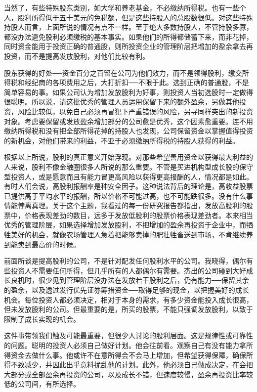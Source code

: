 \documentclass[UTF8,a4paper,zihao=-4,fontset = windows]{ctexart} %
\begin{document}
当然了，有些特殊股东类别，如大学和养老基金，不必缴纳所得税。也有一些个人，股利所得低于五十美元的免税额，但是这些持股人的总股数很低。对这些特殊持股人而言，上面所说的情况有点不一样。至于绝大多数持股人，不管持股多寡，都没办法避免股利必须缴税的基本事实。如果他们的所得都储蓄下来，而非花掉，同时资金能用于投资正确的普通股，则所投资企业的管理阶层把增加的盈余拿去再投资，而不是提高发放股利，对他们比较有利。

股东获得的好处──资金百分之百留在公司为他们效力，而不是领得股利，缴交所得税和经纪商的各项费用之后，大打折扣──不限于此。选到正确的普通股，不是简单容易的事。如果公司认为增加发放股利为好事，则投资人当初选股时一定做得很聪明。所以说，请这批优秀的管理人员运用保留下来的额外盈余，另做其他投资，风险比较低，以免自己必须再冒犯下严重错误的风险，另寻同样突出的新投资对象。考虑要保留或发放盈余增加部分的公司愈是优秀，这个因素愈重要。连不用缴纳所得税和没有把全部所得花掉的持股人也发现，公司保留资金以掌握值得投资的新机会，对他们带来的利益，不亚于必须缴纳所得税的持股人获得的利益。

根据以上所说，股利的真正意义开始浮现。对那些希望善用资金以获得最大利益的人来说，股利不像金融圈很多人所说的那么重要。不管是买进机构型成长股的保守型投资人，或是愿意而且有能力冒更高风险以获得更高报酬的人，情况都是如此。有时人们会说，高股利报酬率是种安全因子。这种说法背后的理论是，高收益股票已提供高于平均水平的报酬，所以价格不可能过高，也不可能跌很多。没有什么事情能悖离真理。关于这个主题，我看过的每一份研究报告都指出，发放高股利的股票中，价格表现差劲的数目，远多于发放低股利的股票价格表现差劲者。本来相当优秀的管理阶层，如果选择增加发放股利，不把增加的盈余再投资于企业中，而牺牲美好的机会，就像农场管理人急着把能够卖掉的肥壮牲畜送到市场，不肯继续养到能卖到最高价的时候。

前面所谈是提高股利的公司，不是针对配发任何股利水平的公司。我晓得，偶尔有些投资人不需要任何所得，但几乎所有的人都偶尔有需要。杰出的公司碰到大好成长良机时，很少见到管理阶层没办法在发放若干股利之后，仍有能力──保留其余的盈余，以及透过发行优先证券筹措资金──取得足够的现金，以把握美好的成长机会。每位投资人都必须决定，相对于本身的需求，有多少资金能投入成长很高，但未发放股利的公司。但最重要的是，所买的股票，不能只强调发放股利，以致于限制了成长实现的机会。

这件事带领我们触及可能最重要，但很少人讨论的股利层面。这是规律性或可靠性的问题。聪明的投资人必须自己做好计划。他会往前看。观察自己有没有能力拿所得资金去做什么事。他或许不在意所得会不会马上增加，但希望获得保障，确保所得不致减少，并因此出乎意料扰乱他的计划。此外，他必须自己做成决定，在会把大部分或全部盈余再投资的公司，以及成长不错，但速度较慢，盈余再投资比率较低的公司间，有所选择。
\end{document}
